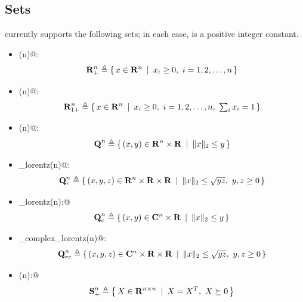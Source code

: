 \documentclass[12pt]{article}
\newcommand{\symm}{{\mbox{\bf S}}}  %
\newcommand{\lorentz}{{\mbox{\bf Q}}}  %
\begin{document}

\subsection{Sets}

\cvx currently supports the following sets; in each case, \verb@n@ is a positive
integer constant.
\begin{itemize}
\item \verb@nonnegative(n)@:
\begin{equation*}
	\mathbf{R}^n_+ \triangleq \left\{\,x\in\mathbf{R}^{n}\,~|~\,x_i\geq 0,~i=1,2,\dots,n\,\right\}
\end{equation*}	
\item \verb@simplex(n)@:
\begin{equation*}
	\mathbf{R}^n_{1+} \triangleq \left\{\,x\in\mathbf{R}^{n}\,~|~\,x_i\geq 0,~i=1,2,\dots,n,~\textstyle\sum_ix_i=1\,\right\}
\end{equation*}	
\item \verb@lorentz(n)@:
\begin{equation*}
\lorentz^n \eqbydef \Condset{(x,y)\in\R^n\times\R}{\|x\|_2\leq y}
\end{equation*}
\item \verb@rotated_lorentz(n)@: 
\begin{equation*}
\lorentz^n_r \eqbydef \Condset{(x,y,z)\in\R^n\times\R\times\R}{\|x\|_2\leq \sqrt{yz},~y,z\geq 0}
\end{equation*}
\item \verb@complex_lorentz(n):@ 
\begin{equation*}
\lorentz^n_c \eqbydef \Condset{(x,y)\in\complex^n\times\R}{\|x\|_2\leq y}
\end{equation*}
\item \verb@rotated_complex_lorentz(n)@: 
\begin{equation*}
\lorentz^n_{rc} \eqbydef \Condset{(x,y,z)\in\complex^n\times\R\times\R}{\|x\|_2\leq \sqrt{yz},~y,z\geq 0}
\end{equation*}
\item \verb@semidefinite(n):@ 
\begin{equation*}
\symm^n_+ \eqbydef \Condset{X\in\R^{n\times n}}{X=X^T,~X\succeq 0}
\end{equation*}

\end{itemize}
\end{document}
